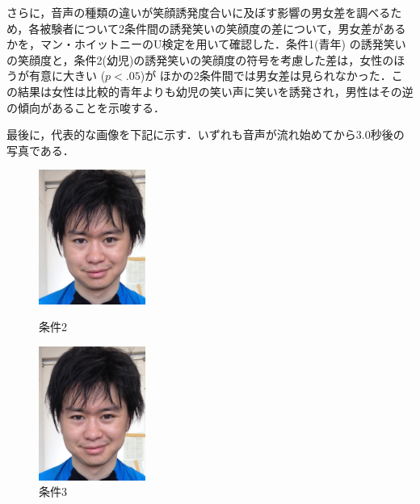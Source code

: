 \documentclass[submit,techreq]{ec2014}
\begin{document}
さらに，音声の種類の違いが笑顔誘発度合いに及ぼす影響の男女差を調べるため，各被験者について2条件間の誘発笑いの笑顔度の差について，男女差があるかを，マン・ホイットニーのU検定を用いて確認した．条件1(青年) の誘発笑いの笑顔度と，条件2(幼児)の誘発笑いの笑顔度の符号を考慮した差は，女性のほうが有意に大きい ($p < .05$)が
ほかの2条件間では男女差は見られなかった．この結果は女性は比較的青年よりも幼児の笑い声に笑いを誘発され，男性はその逆の傾向があることを示唆する．



最後に，代表的な画像を下記に示す．いずれも音声が流れ始めてから3.0秒後の写真である．

\begin{figure}[h!]
\begin{minipage}{0.49\columnwidth}
\begin{center}
\includegraphics[width=35mm, bb=0 0 663 834]{images/nagatatsucap_15.jpg}
\caption{条件2}
\end{center}
\end{minipage}
\begin{minipage}{0.49\columnwidth}
\begin{center}
\includegraphics[width=35mm, bb=0 0 663 834]{images/nagatatsucap_41.jpg}
\caption{条件3}
\end{center}
\end{minipage}
\end{figure}
\end{document}
